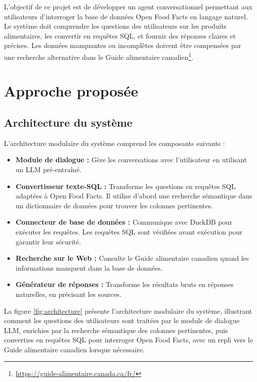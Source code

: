 \documentclass[a4paper,11pt]{article}
\begin{document}
L'objectif de ce projet est de développer un agent conversationnel permettant aux utilisateurs 
d'interroger la base de données Open Food Facts en langage naturel. Le système doit comprendre les 
questions des utilisateurs sur les produits alimentaires, les convertir en requêtes SQL, et fournir
des réponses claires et précises. Les données manquantes ou incomplètes doivent être compensées 
par une recherche alternative 
dans le Guide alimentaire canadien\footnote{\url{https://guide-alimentaire.canada.ca/fr/}}.




\section{Approche proposée}
\label{sec:approche}

\subsection{Architecture du système}

L'architecture modulaire du système comprend les composants suivants :

\begin{itemize}
    \item \textbf{Module de dialogue :} Gère les conversations avec l'utilisateur en utilisant un LLM pré-entraîné.
    \item \textbf{Convertisseur texte-SQL :} Transforme les questions en requêtes SQL adaptées à 
    Open Food Facts. Il utilise d'abord une recherche sémantique dans un dictionnaire de données pour trouver les colonnes pertinentes.
    \item \textbf{Connecteur de base de données :} Communique avec DuckDB pour exécuter les requêtes. Les requêtes SQL sont vérifiées avant exécution pour garantir leur sécurité.
    \item \textbf{Recherche sur le Web :} Consulte le Guide alimentaire canadien quand les informations manquent dans la base de données.
    \item \textbf{Générateur de réponses :} Transforme les résultats bruts en réponses naturelles, en précisant les sources.
\end{itemize}

La figure \ref{fig:architecture} présente l'architecture modulaire du système, illustrant comment les questions des utilisateurs sont traitées par le module de dialogue LLM, enrichies par la recherche sémantique des colonnes pertinentes, puis converties en requêtes SQL pour interroger Open Food Facts, avec un repli vers le Guide alimentaire canadien lorsque nécessaire.
\end{document}

